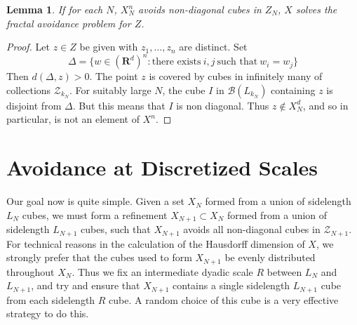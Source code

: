 \documentclass{article}
\theoremstyle{plain}
\newtheorem{lemma}{Lemma}
\theoremstyle{plain}
\begin{document}
\begin{multicols}{2}
\begin{lemma}
	If for each $N$, $X_N^n$ avoids non-diagonal cubes in $Z_N$, $X$ solves the fractal avoidance problem for $Z$.
\end{lemma}
\begin{proof}
	Let $z \in Z$ be given with $z_1, \dots, z_n$ are distinct. Set
	\[ \Delta = \{ w \in (\mathbf{R}^d)^n : \text{there exists}\ i,j\ \text{such that}\ w_i = w_j \} \]
	Then $d(\Delta,z) > 0$. The point $z$ is covered by cubes in infinitely many of collections $\mathcal{Z}_{k_N}$. For suitably large $N$, the cube $I$ in $\mathcal{B}(L_{k_N})$ containing $z$ is disjoint from $\Delta$. But this means that $I$ is non diagonal. Thus $z \not \in X_N^d$, and so in particular, is not an element of $X^n$.
\end{proof}


\section{Avoidance at Discretized Scales}

Our goal now is quite simple. Given a set $X_N$ formed from a union of sidelength $L_N$ cubes, we must form a refinement $X_{N+1} \subset X_N$ formed from a union of sidelength $L_{N+1}$ cubes, such that $X_{N+1}$ avoids all non-diagonal cubes in $\mathcal{Z}_{N+1}$. For technical reasons in the calculation of the Hausdorff dimension of $X$, we strongly prefer that the cubes used to form $X_{N+1}$ be evenly distributed throughout $X_N$. Thus we fix an intermediate dyadic scale $R$ between $L_N$ and $L_{N+1}$, and try and ensure that $X_{N+1}$ contains a single sidelength $L_{N+1}$ cube from each sidelength $R$ cube. A random choice of this cube is a very effective strategy to do this.


\end{multicols}
\end{document}

